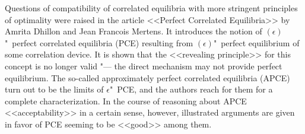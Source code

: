 Questions of compatibility of correlated equilibria with more stringent principles of optimality were raised in the article <<Perfect Correlated Equilibria>> \cite{Dhillon} by Amrita Dhillon and Jean Francois Mertens. It introduces the notion of $(\epsilon)$"~perfect correlated equilibria (PCE) resulting from $(\epsilon)$"~perfect equilibrium of some correlation device. It is shown that the <<revealing principle>> for this concept is no longer valid "--- the direct mechanism may not provide perfect equilibrium. The so-called approximately perfect correlated equilibria (APCE) turn out to be the limits of $\epsilon$"~PCE, and the authors reach for them for a complete characterization. In the course of reasoning about APCE <<acceptability>> in a certain sense, however, illustrated arguments are given in favor of PCE seeming to be <<good>> among them. %

